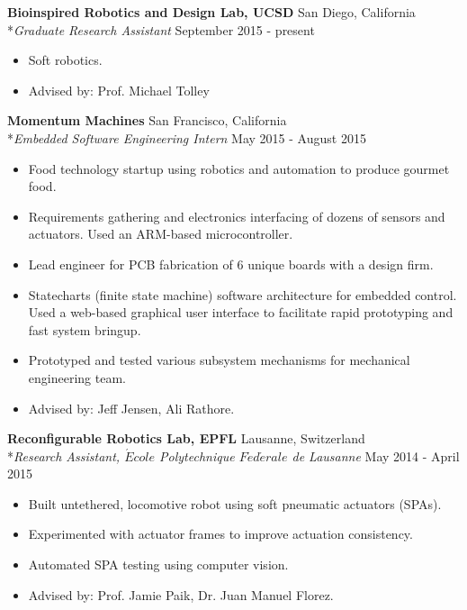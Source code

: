 \documentclass{res}
\begin{document}
 {\bf Bioinspired Robotics and Design Lab, UCSD} \hfill San Diego, California
    \\*\emph{Graduate Research Assistant} \hfill September 2015 - present
\begin{itemize}
    \item Soft robotics.
    \item Advised by: Prof. Michael Tolley
\end{itemize}

 {\bf Momentum Machines} \hfill San Francisco, California
    \\*\emph{Embedded Software Engineering Intern} \hfill May 2015 - August 2015
\begin{itemize}
    \item Food technology startup using robotics and automation to produce gourmet food. 
    \item Requirements gathering and electronics interfacing of dozens of sensors and actuators. Used an ARM-based microcontroller.
    \item Lead engineer for PCB fabrication of 6 unique boards with a design firm.
    \item Statecharts (finite state machine) software architecture for embedded control. Used a web-based graphical user interface to facilitate rapid prototyping and fast system bringup.
    \item Prototyped and tested various subsystem mechanisms for mechanical engineering team.
    \item Advised by: Jeff Jensen, Ali Rathore.
\end{itemize}

 {\bf Reconfigurable Robotics Lab, EPFL} \hfill Lausanne, Switzerland
    \\*\emph{Research Assistant, $\acute{E}cole$ Polytechnique $F\acute{e}d\acute{e}rale$ de Lausanne} \hfill May 2014 - April 2015
\begin{itemize}
    \item Built untethered, locomotive robot using soft pneumatic actuators (SPAs).
    \item Experimented with actuator frames to improve actuation consistency.
    \item Automated SPA testing using computer vision.
    \item Advised by: Prof. Jamie Paik, Dr. Juan Manuel Florez.
\end{itemize}
\end{document}
